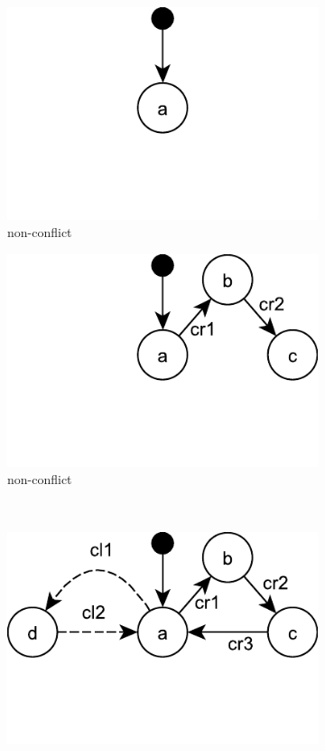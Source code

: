 \begin{figure}[ht]
\begin{subfigure}[t]{0.48\linewidth}
	\includegraphics[width=\linewidth]{statechart_01}
	\caption{non-conflict}
	\label{fig:statechart_01}
\end{subfigure}
\hfill
\begin{subfigure}[t]{0.48\linewidth}
	\includegraphics[width=\linewidth]{statechart_02}
	\caption{non-conflict}
	\label{fig:statechart_02}
\end{subfigure}
\\
\begin{subfigure}[t]{0.48\linewidth}
	\includegraphics[width=\linewidth]{statechart_03}

\end{subfigure}
\end{figure}
